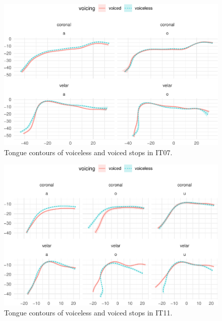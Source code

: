 \documentclass[12pt,]{article}
\begin{document}
\begin{figure}

{\centering \includegraphics[width=.8\textwidth]{2018-polar-gam_files/figure-latex/tongues-it07-1} 

}

\caption{Tongue contours of voiceless and voiced stops in IT07.}\label{f:tongues-it07}
\end{figure}

\begin{figure}

{\centering \includegraphics[width=.8\textwidth]{2018-polar-gam_files/figure-latex/tongues-it11-1} 

}

\caption{Tongue contours of voiceless and voiced stops in IT11.}\label{f:tongues-it11}
\end{figure}
\end{document}
